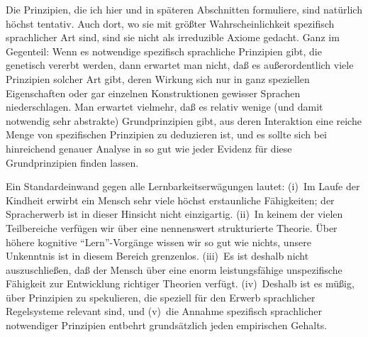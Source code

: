 \documentclass[output=paper]{langsci/langscibook}
\begin{document}
Die Prinzipien, die ich hier und in späteren Abschnitten formuliere,
sind natürlich höchst tentativ. Auch dort, wo sie mit größter
Wahrscheinlichkeit spezifisch sprachlicher Art sind, sind sie nicht
als irreduzible Axiome gedacht. Ganz im Gegenteil: Wenn es notwendige
spezifisch sprachliche Prinzipien gibt, die genetisch vererbt werden,
dann erwartet man nicht, daß es außerordentlich viele Prinzipien
solcher Art gibt, deren Wirkung sich nur in ganz speziellen
Eigenschaften oder gar einzelnen Konstruktionen gewisser Sprachen
niederschlagen. Man erwartet vielmehr, daß es relativ wenige (und
damit notwendig sehr abstrakte) Grundprinzipien gibt, aus deren
Interaktion eine reiche Menge von spezifischen Prinzipien zu
deduzieren ist, und es sollte sich bei hinreichend genauer Analyse in
so gut wie jeder  Evidenz für diese Grundprinzipien
finden lassen.

Ein Standardeinwand gegen alle Lernbarkeitserwägungen lautet: (i)~Im
Laufe der Kindheit erwirbt ein Mensch sehr viele höchst erstaunliche
Fähigkeiten; der Spracherwerb ist in dieser Hinsicht nicht
einzigartig. (ii)~In keinem der vielen Teilbereiche verfügen wir über
eine nennenswert strukturierte Theorie. Über höhere kognitive
"`Lern"'-Vorgänge wissen wir so gut wie nichts, unsere Unkenntnis ist in
diesem Bereich grenzenlos. (iii)~Es ist deshalb nicht auszuschließen,
daß der Mensch über eine enorm leistungsfähige unspezifische Fähigkeit
zur Entwicklung richtiger Theorien verfügt. (iv)~Deshalb ist es müßig,
über Prinzipien zu spekulieren, die speziell für den Erwerb
sprachlicher Regelsysteme relevant sind, und (v)~die Annahme
spezifisch sprachlicher notwendiger Prinzipien entbehrt grundsätzlich
jeden empirischen Gehalts.
\end{document}
